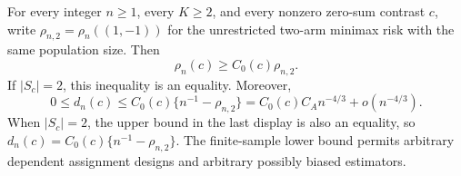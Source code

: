 For every integer \(n\geq1\), every \(K\geq2\), and every nonzero zero-sum contrast \(c\), write \(\rho_{n,2}=\rho_n((1,-1))\) for the unrestricted two-arm minimax risk with the same population size. Then
\[
 \rho_n(c)\geq C_0(c)\rho_{n,2}.
\]
If \(|S_c|=2\), this inequality is an equality. Moreover,
\[
 0\leq d_n(c)\leq C_0(c)\{n^{-1}-\rho_{n,2}\}
 =C_0(c)C_A n^{-4/3}+o(n^{-4/3}).
\]
When \(|S_c|=2\), the upper bound in the last display is also an equality, so \(d_n(c)=C_0(c)\{n^{-1}-\rho_{n,2}\}\). The finite-sample lower bound permits arbitrary dependent assignment designs and arbitrary possibly biased estimators.
